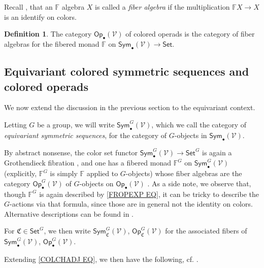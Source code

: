 \documentclass[a4paper,10pt
,draft
]{article}%
\numberwithin{equation}{section}
\numberwithin{figure}{section}
\theoremstyle{definition} %
\newtheorem{definition}[equation]{Definition}%
\newcommand{\V}{\ensuremath{\mathcal V}}
\newcommand{\1}{\ensuremath{\mathbbm 1}}%
\begin{document}
Recall \cite[Def. \ref{OC-FIBMON DEF}]{BP_FCOP},
that an $\mathbb{F}$ algebra $X$
is called a \emph{fiber algebra}
if the multiplication 
$\mathbb{F} X \to X$
is an identify on colors.


\begin{definition}
	The category 
	$\mathsf{Op}_{\bullet}(\V)$
	of colored operads
	is the category of fiber algebras for
	the fibered monad $\mathbb{F}$ on
	$\mathsf{Sym}_{\bullet}(\V) \to \mathsf{Set}$.
\end{definition}








\subsection{Equivariant colored symmetric sequences and colored operads}



We now extend the discussion in the previous section to the equivariant context.

Letting $G$ be a group,
we will write
$\mathsf{Sym}^G_{\bullet}(\V)$,
which we call the category of
\emph{equivariant symmetric sequences},
for the category of $G$-objects in $\mathsf{Sym}_{\bullet}(\V)$.

By abstract nonsense, 
the color set functor
$\mathsf{Sym}^G_{\bullet}(\V) 
\to \mathsf{Set}^G$
is again a Grothendieck fibration
\cite[Rem. \ref{OC-FUNISGROTH REM}]{BP_FCOP},
and one has a fibered monad
$\mathbb{F}^G$ on $\mathsf{Sym}^G_{\bullet}(\V)$
(explicitly, $\mathbb{F}^G$
is simply $\mathbb{F}$ applied to $G$-objects)
whose fiber algebras
are the category 
$\mathsf{Op}^G_{\bullet}(\V)$
of $G$-objects on $\mathsf{Op}_{\bullet}(\V)$
\cite[Prop. \ref{OC-DIAGRAMFM_PROP}]{BP_FCOP}.
As a side note, we observe that, 
though $\mathbb{F}^G$ is again described by 
\eqref{FROPEXP EQ},
it can be tricky to describe the $G$-actions via that formula, 
since those are in general not the identity on colors.
Alternative descriptions can be found in 
\cite[Prop. \ref{OC-FGC PROP} and Rem. \ref{OC-FROPEXPG REM}]{BP_FCOP}.

For $\mathfrak{C} \in \mathsf{Set}^G$,
we then write
$\mathsf{Sym}^G_{\mathfrak{C}}(\V)$,
$\mathsf{Op}^G_{\mathfrak{C}}(\V)$
for the associated fibers of
$\mathsf{Sym}^G_{\bullet}(\V)$,
$\mathsf{Op}^G_{\bullet}(\V)$.

Extending \eqref{COLCHADJ EQ},
we then have the following, 
cf. \cite[Rem. \ref{OC-OP_MAP REM}]{BP_FCOP}.
\end{document}
